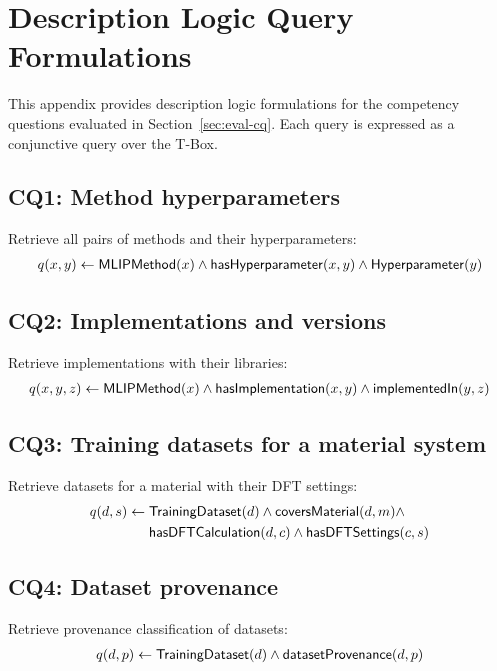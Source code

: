\section{Description Logic Query Formulations}
\label{sec:appendix-dl-queries}

This appendix provides description logic formulations for the competency
questions evaluated in Section~\ref{sec:eval-cq}. Each query is expressed
as a conjunctive query over the \MLIPsOntology{} T-Box.

\subsection{CQ1: Method hyperparameters}

Retrieve all pairs of methods and their hyperparameters:
\begin{align*}
  q(x, y) \leftarrow \mathsf{MLIPMethod}(x) \wedge \mathsf{hasHyperparameter}(x, y) \wedge \mathsf{Hyperparameter}(y)
\end{align*}

\subsection{CQ2: Implementations and versions}

Retrieve implementations with their libraries:
\begin{align*}
  q(x, y, z) \leftarrow \mathsf{MLIPMethod}(x) \wedge \mathsf{hasImplementation}(x, y) \wedge \mathsf{implementedIn}(y, z)
\end{align*}

\subsection{CQ3: Training datasets for a material system}

Retrieve datasets for a material with their DFT settings:
\begin{align*}
  q(d, s) \leftarrow{} & \mathsf{TrainingDataset}(d) \wedge \mathsf{coversMaterial}(d, m) \wedge \\
    & \mathsf{hasDFTCalculation}(d, c) \wedge \mathsf{hasDFTSettings}(c, s)
\end{align*}

\subsection{CQ4: Dataset provenance}

Retrieve provenance classification of datasets:
\begin{align*}
  q(d, p) \leftarrow \mathsf{TrainingDataset}(d) \wedge \mathsf{datasetProvenance}(d, p)
\end{align*}

